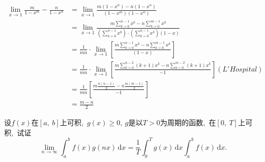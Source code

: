 	\begin{solution}
		\begin{align*}
			\lim\limits_{x\rightarrow 1}\frac{m}{1-x^m}-\frac{n}{1-x^n}&=\lim\limits_{x\rightarrow 1}\frac{m(1-x^n)-n(1-x^n)}{(1-x^m)(1-x^n)}\\
			&=\lim\limits_{x\rightarrow 1}\frac{m\sum\limits_{k=0}^{n-1}x^k-n\sum\limits_{k=0}^{m-1}x^k}{\left(\sum\limits_{k=0}^{n-1}x^k\right)\cdot\left(\sum\limits_{k=0}^{n-1}x^k\right)(1-x)}\\
			&=\frac{1}{mn}\cdot\lim\limits_{x\rightarrow 1}\left[\frac{m\sum\limits_{k=0}^{n-1}x^k-n\sum\limits_{k=0}^{m-1}x^k}{(1-x)}\right]\\
			&=\frac{1}{mn}\cdot\lim\limits_{x\rightarrow 1}\left[\frac{m\sum\limits_{k=0}^{n-2}(k+1)x^k-n\sum\limits_{k=0}^{m-2}(k+1)x^k}{-1}\right](L'Hospital)\\
			&=\frac{1}{mn}\left[\frac{m\frac{n(n-1)}{2}-n\frac{m(m-1)}{2}}{-1}\right]\\
			&=\frac{m-n}{2}
		\end{align*}
	\end{solution}
	\newpage
	\begin{problem}
		设$f(x)$在$[a,\ b]$上可积,\ $g(x)\geqslant 0,\ g$是以$T>0$为周期的函数,\ 在$[0,\ T]$上可积,\ 试证$$\lim\limits_{n\to\infty}\int_{a}^{b}f(x)g(nx)\,\text{d}x=\frac{1}{T}\int_{0}^{T}g(x)\,\text{d}x\int_{a}^{b}f(x)\,\text{d}x.$$
	\end{problem}
